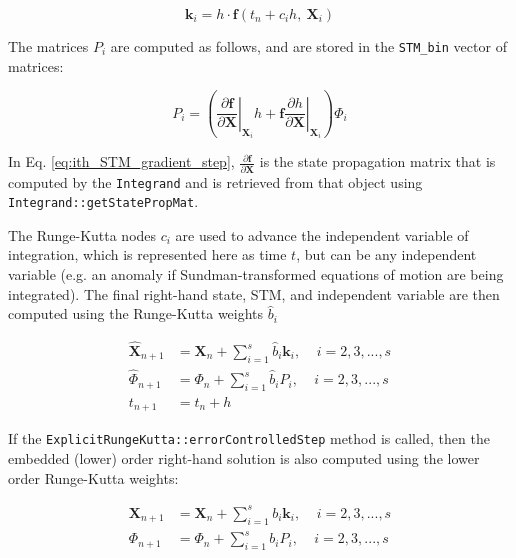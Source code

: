 \begin{equation}
\mathbf{k}_i = h \cdot \mathbf{f}\left(t_n + c_i h, ~ \mathbf{X}_{i}\right) \label{eq:ith_gradient_step}
\end{equation}

\noindent The matrices $P_i$ are computed as follows, and are stored in the \texttt{STM\_bin} vector of matrices:

\begin{equation}
P_i = \left( \left. \frac{\partial \mathbf{f}}{\partial \mathbf{X}} \right|_{\mathbf{X}_{i}} h + \mathbf{f}\left. \frac{\partial h}{\partial \mathbf{X}} \right|_{\mathbf{X}_{i}} \right) \Phi_{i} \label{eq:ith_STM_gradient_step}
\end{equation}

\noindent In Eq. \ref{eq:ith_STM_gradient_step}, $\frac{\partial \mathbf{f}}{\partial \mathbf{X}}$ is the state propagation matrix that is computed by the \texttt{Integrand} and is retrieved from that object using \texttt{Integrand::getStatePropMat}.

\noindent The Runge-Kutta nodes $c_i$ are used to advance the independent variable of integration, which is represented here as time $t$, but can be any independent variable (e.g. an anomaly if Sundman-transformed equations of motion are being integrated). The final right-hand state, STM, and independent variable are then computed using the Runge-Kutta weights $\hat{b}_i$ 


\begin{align}
\hat{\mathbf{X}}_{n+1} &= \mathbf{X}_{n} + \sum^s_{i=1} \hat{b}_i \mathbf{k}_i, ~~~~~ i = 2,3,...,s \label{eq:ExplicitRKstateStep}\\
\hat{\Phi}_{n+1} &= \Phi_{n} + \sum^s_{i=1} \hat{b}_i P_i, ~~~~~ i = 2,3,...,s \label{eq:ExplicitRKphiStep}\\
t_{n+1} &= t_n + h \label{eq:timestep}
\end{align} 
 
\noindent If the \texttt{ExplicitRungeKutta::errorControlledStep} method is called, then the embedded (lower) order right-hand solution is also computed using the lower order Runge-Kutta weights:

\begin{align}
\mathbf{X}_{n+1} &= \mathbf{X}_{n} + \sum^s_{i=1} b_i \mathbf{k}_i, ~~~~~ i = 2,3,...,s \label{eq:ExplicitRKstateStep_lower}\\
\Phi_{n+1} &= \Phi_{n} + \sum^s_{i=1} b_i P_i, ~~~~~ i = 2,3,...,s \label{eq:ExplicitRKphiStep_lower}
\end{align}

